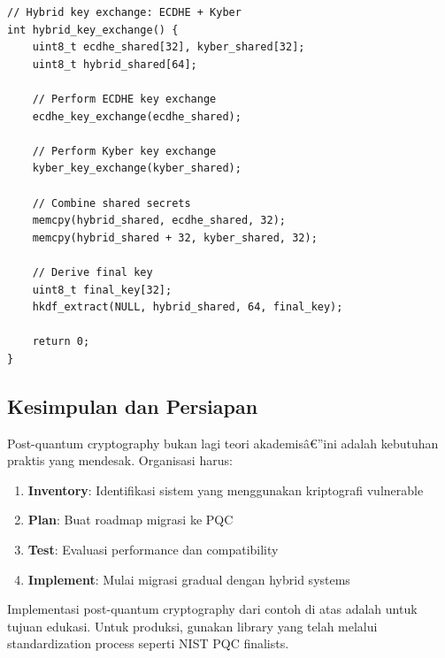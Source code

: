\begin{lstlisting}[style=cstyle, caption={Hybrid TLS 1.3 with PQC}]
// Hybrid key exchange: ECDHE + Kyber
int hybrid_key_exchange() {
    uint8_t ecdhe_shared[32], kyber_shared[32];
    uint8_t hybrid_shared[64];
    
    // Perform ECDHE key exchange
    ecdhe_key_exchange(ecdhe_shared);
    
    // Perform Kyber key exchange
    kyber_key_exchange(kyber_shared);
    
    // Combine shared secrets
    memcpy(hybrid_shared, ecdhe_shared, 32);
    memcpy(hybrid_shared + 32, kyber_shared, 32);
    
    // Derive final key
    uint8_t final_key[32];
    hkdf_extract(NULL, hybrid_shared, 64, final_key);
    
    return 0;
}
\end{lstlisting}

\subsection{Kesimpulan dan Persiapan}

Post-quantum cryptography bukan lagi teori akademisâ€”ini adalah kebutuhan praktis yang mendesak. Organisasi harus:

\begin{enumerate}
  \item \textbf{Inventory}: Identifikasi sistem yang menggunakan kriptografi vulnerable
  \item \textbf{Plan}: Buat roadmap migrasi ke PQC
  \item \textbf{Test}: Evaluasi performance dan compatibility
  \item \textbf{Implement}: Mulai migrasi gradual dengan hybrid systems
\end{enumerate}

\begin{catatan}
Implementasi post-quantum cryptography dari contoh di atas adalah untuk tujuan edukasi. Untuk produksi, gunakan library yang telah melalui standardization process seperti NIST PQC finalists.
\end{catatan}

